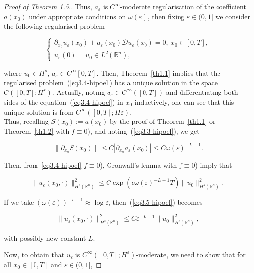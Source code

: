 \documentclass[12pt]{amsart}
\theoremstyle{definition}
\begin{document}
\begin{proof}[Proof of Theorem 1.5.]
Thus, $a_{\varepsilon}$ is $C^{\infty}$-moderate regularisation of the coefficient $a(x_0)$ under appropriate conditions on $\omega(\varepsilon)$, then fixing $\varepsilon\in(0,1]$ we consider the following regularised problem

\begin{equation}
\left\{
\begin{array}{l}
\partial_{x_0}u_{\varepsilon}(x_0)+a_{\varepsilon}(x_0)\mathcal{D}u_{\varepsilon}(x_0)=0,\ x_0\in[0,T], \\
u_{\varepsilon}(0)=u_{0}\in L^{2}(\mathbb{R}^n), 
\end{array}
\right. 
\label{eq3.4-hipoel} 
\end{equation}

where $u_{0}\in H^s$, $a_{\varepsilon}\in C^{\infty}[0,T]$. Then, Theorem~\ref{th1.1} implies that the regularised problem~(\ref{eq3.4-hipoel}) has a unique solution in the space $C([0,T]; H^s)$. Actually, noting \(a_{\varepsilon}\in C^{\infty}([0,T])\) and differentiating both sides of the equation~(\ref{eq3.4-hipoel}) in \(x_0\) inductively, one can see that this unique solution is from \(C^{\infty}([0,T];H{\varepsilon})\).\\

Thus, recalling $S(x_0):= a(x_0)$ 
by the proof of Theorem~\ref{th1.1} or Theorem~\ref{th1.2} with \(f\equiv 0\)), and noting~(\ref{eq3.3-hipoel}), we get

\[
\|\partial_{x_0}S(x_0)\|\leq C|\partial_{x_0}a_{\varepsilon}(x_0)|\leq C\omega(\varepsilon)^{-L-1}.
\]

Then, from~\ref{eq3.4-hipoel}  \(f\equiv 0\)), Gronwall's lemma with \(f\equiv 0\)) imply that

\begin{equation}
\|u_{\varepsilon}(x_0,\cdot)\|^{2}_{ H^s(\mathbb{R}^n)} \leq C\exp(c\omega(\varepsilon)^{-L-1}T)\|u_{0}\|^{2}_{ H^s(\mathbb{R}^n)}. ~\label{eq3.5-hipoel}
\end{equation}

If we take \((\omega(\varepsilon))^{-L-1}\approx\log\varepsilon\), then~(\ref{eq3.5-hipoel}) becomes

\[
\|u_{\varepsilon}(x_0,\cdot)\|^{2}_{ H^s(\mathbb{R}^n)} \leq C\varepsilon^{-L-1}\|u_{0}\|^{2}_{ H^s(\mathbb{R}^n)},
\]

with possibly new constant \(L\).

Now, to obtain that \(u_{\varepsilon}\) is \(C^{\infty}([0,T];H^{\varepsilon})\)-moderate, we need to show that for all \(x_0\in[0,T]\) and \(\varepsilon\in(0,1]\),


\end{proof}
\end{document}

